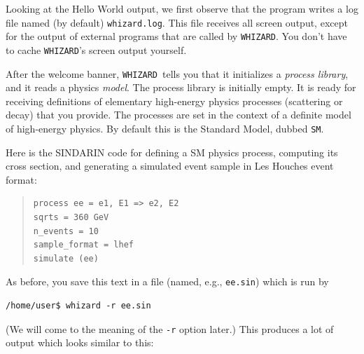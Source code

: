 \documentclass[12pt]{book}
\newcommand{\whizard}{\texttt{WHIZARD}}
\begin{document}
Looking at the Hello World output, we first observe that the program
writes a log file named (by default) \verb|whizard.log|.  This file
receives all screen output, except for the output of external programs
that are called by \whizard.  You don't have to cache \whizard's screen
output yourself.

After the welcome banner, \whizard\ tells you that it initializes a
\emph{process library}, and it reads a physics \emph{model}.  The
process library is initially empty.  It is ready for receiving
definitions of elementary high-energy physics processes (scattering or
decay) that you provide.  The processes are set in the context of a
definite model of high-energy physics.  By default this is the
Standard Model, dubbed \verb|SM|.

Here is the SINDARIN code for defining a SM physics process, computing
its cross section, and generating a simulated event sample in Les Houches
event format:
\begin{quote}
\begin{verbatim}
process ee = e1, E1 => e2, E2
sqrts = 360 GeV
n_events = 10
sample_format = lhef
simulate (ee)
\end{verbatim}
\end{quote}
As before, you save this text in a file (named, e.g., 
\verb|ee.sin|) which is run by
\begin{verbatim}
/home/user$ whizard -r ee.sin
\end{verbatim}
(We will come to the meaning of the \verb|-r| option later.)
This produces a lot of output which looks similar to this:
\end{document}
